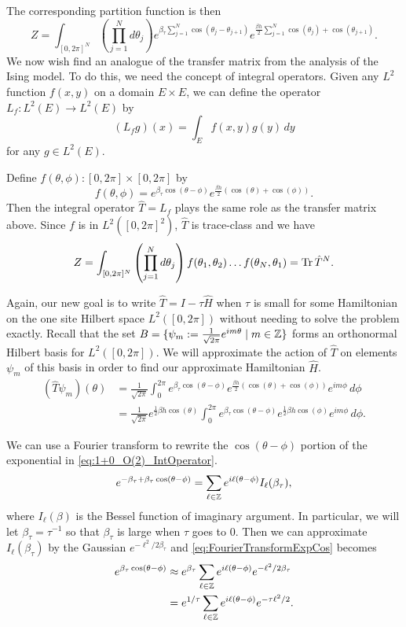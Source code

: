 \documentclass[11pt,reqno]{amsart}
\numberwithin{equation}{section}
\begin{document}
	The corresponding partition function is then
	\[ Z = \int_{[0,2\pi]^N} \left(\prod_{j=1}^N d\theta_j \right) e^{\beta_\tau \sum_{j=1}^N \cos(\theta_j-\theta_{j+1})} e^{\frac{\beta h}{2}  \sum_{j=1}^N \cos(\theta_j)+\cos(\theta_{j+1})}. \]
	We now wish find an analogue of the transfer matrix from the analysis of the Ising model.
	To do this, we need the concept of integral operators.
	Given any $L^2$ function $f(x,y)$ on a domain $E\times E$, we can define the operator $L_f : L^2(E) \to L^2(E)$ by 
	\[(L_f g)(x)=\int_E f(x,y)g(y)\, dy \]
	for any $g \in L^2(E)$.
	
	Define $f(\theta,\phi): [0,2\pi]\times [0,2\pi]$ by 
	\[f(\theta,\phi)=e^{\beta_\tau \cos(\theta -\phi)}e^{\frac{\beta h}{2}(\cos(\theta)+\cos(\phi))}. \]
	Then the integral operator $\hat{T}=L_f$ plays the same role as the transfer matrix above.
	Since $f$ is in $L^2([0,2\pi]^2)$, $\hat{T}$ is trace-class and we have
	\[Z= \int_{[0,2\pi]^N} \left(\prod_{j=1}^N d\theta_j \right) f(\theta_1,\theta_2)\ldots f(\theta_N,\theta_1) = \Tr \hat{T}^N. \]
	
	Again, our new goal is to write $\hat{T}=I-\tau\hat{H}$ when $\tau$ is small for some Hamiltonian on the one site Hilbert space $L^2([0,2\pi])$ without needing to solve the problem exactly. 
	Recall that the set $B=\{\psi_m:=\frac{1}{\sqrt{2\pi}} e^{im\theta} \mid m \in \mathbb{Z} \}$ forms an orthonormal Hilbert basis for $L^2([0,2\pi])$.
	We will approximate the action of $\hat{T}$ on elements $\psi_m$ of this basis in order to find our approximate Hamiltonian $\hat{H}$.
	\begin{align}
		(\hat{T}\psi_m)(\theta) &= \frac{1}{\sqrt{2\pi}}\int_{0}^{2\pi} e^{\beta_\tau \cos(\theta -\phi)}e^{\frac{\beta h}{2}(\cos(\theta)+\cos(\phi))} e^{im\phi}\, d\phi \nonumber \\
		&=\frac{1}{\sqrt{2\pi}}e^{\frac{1}{2}\beta h \cos(\theta)} \int_{0}^{2\pi} e^{\beta_\tau \cos(\theta -\phi)}e^{\frac{1}{2}\beta h \cos(\phi)}e^{im\phi}\, d\phi. \label{eq:1+0_O(2)_IntOperator}
	\end{align}
	
	We can use a Fourier transform to rewrite the $\cos(\theta-\phi)$ portion of the exponential in \cref{eq:1+0_O(2)_IntOperator}.
	\begin{equation}\label{eq:FourierTransformExpCos}
		e^{-\beta_\tau+\beta_\tau\cos(\theta-\phi)}=\sum_{\ell\in \mathbb{Z}}e^{i\ell(\theta-\phi)}I_\ell(\beta_\tau),
	\end{equation}
	where $I_\ell(\beta)$ is the Bessel function of imaginary argument.
	In particular, we will let $\beta_\tau=\tau^{-1}$ so that $\beta_\tau$ is large when $\tau$ goes to 0. 
	Then we can approximate $I_\ell(\beta_\tau)$ by the Gaussian $e^{-\ell^2/2\beta_\tau}$ and \cref{eq:FourierTransformExpCos} becomes
	\begin{align}
		e^{\beta_\tau\cos(\theta-\phi)}&\approx e^{\beta_\tau}\sum_{\ell\in \mathbb{Z}}e^{i\ell(\theta-\phi)}e^{-\ell^2/2\beta_\tau}\\
			&=e^{1/\tau}\sum_{\ell\in \mathbb{Z}}e^{i\ell(\theta-\phi)}e^{-\tau\ell^2/2}. \label{eq:FourierTransformExpCosApprox}
	\end{align}
	
\end{document}
